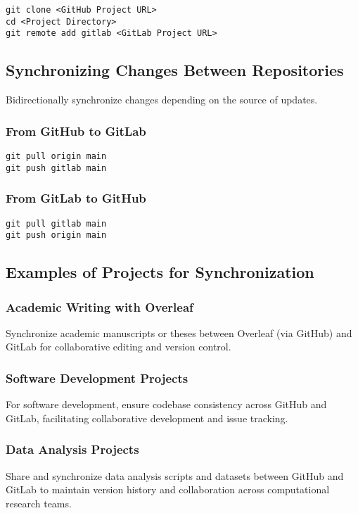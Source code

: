\documentclass[12pt]{article}
\begin{document}
\lstset{language=bash}
\begin{lstlisting}
git clone <GitHub Project URL>
cd <Project Directory>
git remote add gitlab <GitLab Project URL>
\end{lstlisting}

\subsection{Synchronizing Changes Between Repositories}
Bidirectionally synchronize changes depending on the source of updates.

\subsubsection{From GitHub to GitLab}
\lstset{language=bash}
\begin{lstlisting}
git pull origin main
git push gitlab main
\end{lstlisting}

\subsubsection{From GitLab to GitHub}
\lstset{language=bash}
\begin{lstlisting}
git pull gitlab main
git push origin main
\end{lstlisting}

\subsection{Examples of Projects for Synchronization}
\subsubsection{Academic Writing with Overleaf}
Synchronize academic manuscripts or theses between Overleaf (via GitHub) and GitLab for collaborative editing and version control.

\subsubsection{Software Development Projects}
For software development, ensure codebase consistency across GitHub and GitLab, facilitating collaborative development and issue tracking.

\subsubsection{Data Analysis Projects}
Share and synchronize data analysis scripts and datasets between GitHub and GitLab to maintain version history and collaboration across computational research teams.
\end{document}
